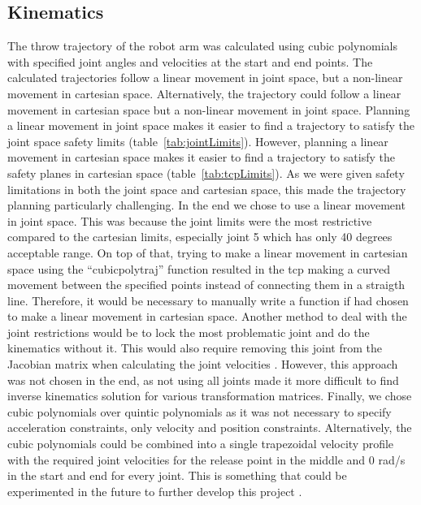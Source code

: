 \subsection{Kinematics}
The throw trajectory of the robot arm was calculated using cubic polynomials with specified joint angles and velocities at the start and end points. The calculated trajectories follow a linear movement in joint space, but a non-linear movement in cartesian space. Alternatively, the trajectory could follow a linear movement in cartesian space but a non-linear movement in joint space. Planning a linear movement in joint space makes it easier to find a trajectory to satisfy the joint space safety limits (table~\ref{tab:jointLimits}). However, planning a linear movement in cartesian space makes it easier to find a trajectory to satisfy the safety planes in cartesian space (table~\ref{tab:tcpLimits}). As we were given safety limitations in both the joint space and cartesian space, this made the trajectory planning particularly challenging. In the end we chose to use a linear movement in joint space. This was because the joint limits were the most restrictive compared to the cartesian limits, especially joint 5 which has only 40 degrees acceptable range. On top of that, trying to make a linear movement in cartesian space using the “cubicpolytraj” \cite{cubicPolyTraj} function resulted in the tcp making a curved movement between the specified points instead of connecting them in a straigth line. Therefore, it would be necessary to manually write a function if had chosen to make a linear movement in cartesian space. Another method to deal with the joint restrictions would be to lock the most problematic joint and do the kinematics without it. This would also require removing this joint from the Jacobian matrix when calculating the joint velocities \cite{kinematicsLecture10}. However, this approach was not chosen in the end, as not using all joints made it more difficult to find inverse kinematics solution for various transformation matrices. Finally, we chose cubic polynomials over quintic polynomials as it was not necessary to specify acceleration constraints, only velocity and position constraints. Alternatively, the cubic polynomials could be combined into a single trapezoidal velocity profile with the required joint velocities for the release point in the middle and 0 rad/s in the start and end for every joint. This is something that could be experimented in the future to further develop this project \cite{kinematicsLecture9}.

